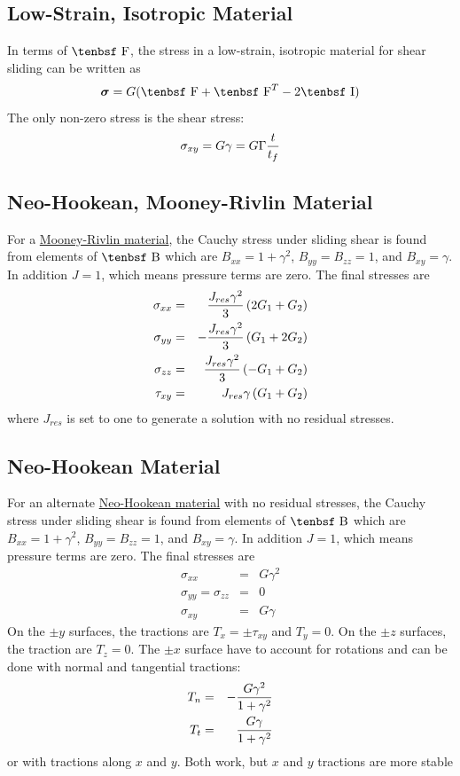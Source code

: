 \documentclass[11pt]{book}
\newcommand{\tens}[1]{\boldsymbol{\mathsf{#1}}}
\def\B{\hbox{\tenbsf B}}
\def\F{\hbox{\tenbsf F}}
\def\I{\hbox{\tenbsf I}}
\def\Jres{J_{res}}
\begin{document}
\subsection{Low-Strain, Isotropic Material}

In terms of $\F$, the stress in a low-strain, isotropic material for shear sliding can be written as
\begin{equation}
    \tens{\sigma} = G(\F + \F^T -2\I)
\end{equation}
The only non-zero stress is the shear stress:
\begin{equation}
    \sigma_{xy} = G\gamma = G\Gamma{t\over t_f}
\end{equation}

\subsection{Neo-Hookean, Mooney-Rivlin Material}

For a  \hyperref[MRM]{Mooney-Rivlin material}, the Cauchy stress under sliding shear is found from elements of $\B$ which are $B_{xx}=1+\gamma^2$, $B_{yy}=B_{zz}=1$, and $B_{xy}=\gamma$. In addition $J=1$, which means pressure terms are zero. The final stresses are
\begin{eqnarray}
     \sigma_{xx} & = & {\Jres\gamma^2\over 3} \left( 2G_1 + G_2 \right) \\
     \sigma_{yy} & = & -{\Jres\gamma^2\over 3} \left( G_1 + 2G_2 \right) \\
     \sigma_{zz} & = & {\Jres\gamma^2\over 3} \left( -G_1 + G_2 \right) \\
     \tau_{xy} & = & \Jres\gamma \left( G_1 + G_2 \right)
\end{eqnarray}
where $\Jres$ is set to one to generate a solution with no residual stresses.

\subsection{Neo-Hookean Material}

For an alternate \hyperref[NHM]{Neo-Hookean material} with no residual stresses, the Cauchy stress under sliding shear is found from elements of $\B$ which are $B_{xx}=1+\gamma^2$, $B_{yy}=B_{zz}=1$, and $B_{xy}=\gamma$. In addition $J=1$, which means pressure terms are zero. The final stresses are
\begin{eqnarray}
      \sigma_{xx} & = & G\gamma^2  \\
      \sigma_{yy} = \sigma_{zz} & = & 0  \\
      \sigma_{xy} & = & G\gamma
\end{eqnarray}
On the $\pm y$ surfaces, the tractions are $T_x = \pm\tau_{xy}$ and $T_y = 0$. On the $\pm z$ surfaces, the traction are $T_z=0$. The $\pm x$ surface have to account for rotations and can be done with normal and tangential tractions:
\begin{eqnarray}
     T_n & = & -{G\gamma^2\over 1+\gamma^2} \\
     T_t & = & {G\gamma\over 1+ \gamma^2} 
\end{eqnarray}
or with tractions along $x$ and $y$. Both work, but $x$ and $y$ tractions are more stable
\end{document}
